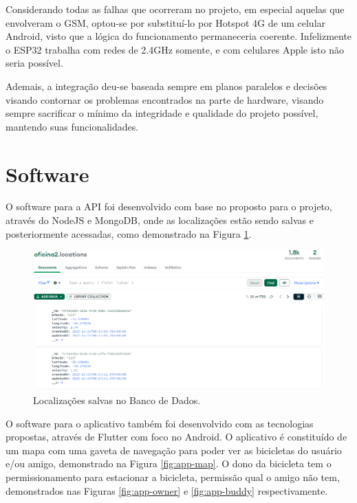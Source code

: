 Considerando todas as falhas que ocorreram no projeto, em especial aquelas que envolveram o GSM, optou-se por substituí-lo por Hotspot 4G de um celular Android, visto que a lógica do funcionamento permaneceria coerente. Infelizmente o ESP32 trabalha com redes de 2.4GHz somente, e com celulares Apple isto não seria possível.

Ademais, a integração deu-se baseada sempre em planos paralelos e decisões visando contornar os problemas encontrados na parte de hardware, visando sempre sacrificar o mínimo da integridade e qualidade do projeto possível, mantendo suas funcionalidades.

\section{Software}
O software para a API foi desenvolvido com base no proposto para o projeto, através do NodeJS e MongoDB, onde as localizações estão sendo salvas e posteriormente acessadas, como demonstrado na Figura \ref{fig:mongodb-locations}.

\begin{figure}[!h]
\centering
\includegraphics[width=15cm]{capitulos/Figuras/mongo-locations.png}
\caption{Localizações salvas no Banco de Dados.}
\label{fig:mongodb-locations}
\end{figure}

O software para o aplicativo também foi desenvolvido com as tecnologias propostas, através de Flutter com foco no Android. O aplicativo é constituído de um mapa com uma gaveta de navegação para poder ver as bicicletas do usuário e/ou amigo, demonstrado na Figura \ref{fig:app-map}. O dono da bicicleta tem o permissionamento para estacionar a bicicleta, permissão qual o amigo não tem, demonstrados nas Figuras \ref{fig:app-owner} e \ref{fig:app-buddy} respectivamente.

